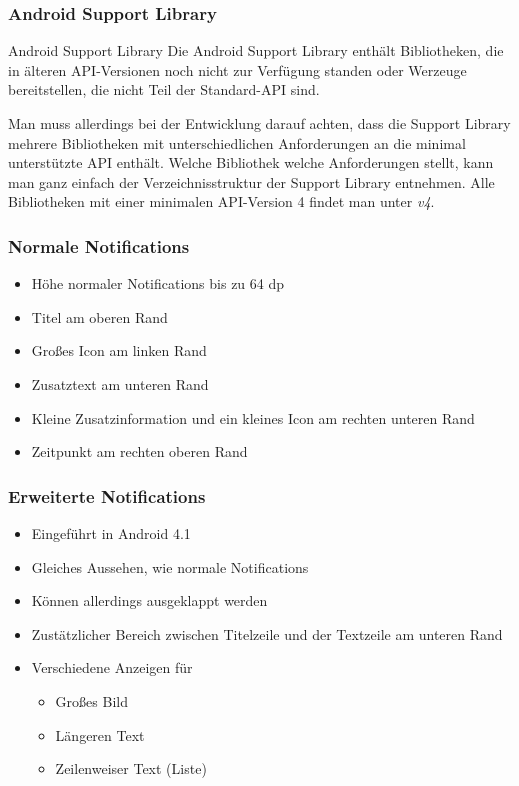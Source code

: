 \begin{frame}
   \frametitle{Android Support Library}
   \begin{alertblock}{Android Support Library}
		Die Android Support Library enthält Bibliotheken, die in älteren API-Versionen 
		noch nicht zur Verfügung standen oder Werzeuge bereitstellen, die nicht Teil 
		der Standard-API sind.

		\vspace{5mm}

		Man muss allerdings bei der Entwicklung darauf achten, dass die Support Library 
		mehrere Bibliotheken mit unterschiedlichen Anforderungen an die minimal unterstützte API 
		enthält. Welche Bibliothek welche Anforderungen stellt, kann man ganz einfach der 
		Verzeichnisstruktur der Support Library entnehmen. Alle Bibliotheken mit einer 
		minimalen API-Version 4 findet man unter \emph{v4}.
   \end{alertblock}
\end{frame}

\begin{frame}
   \frametitle{Normale Notifications}
   \begin{itemize}
      \item Höhe normaler Notifications bis zu 64 dp
      \item Titel am oberen Rand
      \item Großes Icon am linken Rand
      \item Zusatztext am unteren Rand
      \item Kleine Zusatzinformation und ein kleines Icon am rechten unteren Rand
      \item Zeitpunkt am rechten oberen Rand
   \end{itemize}
\end{frame}

\begin{frame}
   \frametitle{Erweiterte Notifications}
   \begin{itemize}
      \item Eingeführt in Android 4.1
      \item Gleiches Aussehen, wie normale Notifications
      \item Können allerdings ausgeklappt werden
      \item Zustätzlicher Bereich zwischen Titelzeile und der Textzeile am unteren Rand
      \item Verschiedene Anzeigen für 
         \begin{itemize}
            \item Großes Bild
            \item Längeren Text
            \item Zeilenweiser Text (Liste)
         \end{itemize}
   \end{itemize}
\end{frame}

